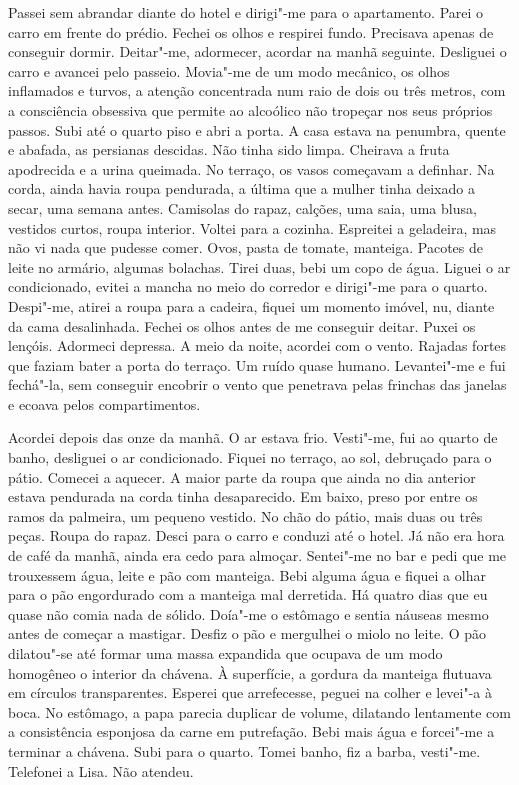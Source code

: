 Passei sem abrandar diante do hotel e dirigi"-me para o apartamento.
Parei o carro em frente do prédio. Fechei os olhos e respirei fundo.
Precisava apenas de conseguir dormir. Deitar"-me, adormecer, acordar na
manhã seguinte. Desliguei o carro e avancei pelo passeio. Movia"-me de
um modo mecânico, os olhos inflamados e turvos, a atenção concentrada
num raio de dois ou três metros, com a consciência obsessiva que permite
ao alcoólico não tropeçar nos seus próprios passos. Subi até o quarto
piso e abri a porta. A casa estava na penumbra, quente e abafada, as persianas
descidas. Não tinha sido limpa. Cheirava a fruta apodrecida e a
urina queimada. No terraço, os vasos começavam a definhar. Na corda,
ainda havia roupa pendurada, a última que a mulher tinha deixado a
secar, uma semana antes. Camisolas do rapaz, calções, uma saia, uma
blusa, vestidos curtos, roupa interior. Voltei para a cozinha. Espreitei
a geladeira, mas não vi nada que pudesse comer. Ovos, pasta de tomate,
manteiga. Pacotes de leite no armário, algumas bolachas. Tirei duas,
bebi um copo de água. Liguei o ar condicionado, evitei a mancha no meio
do corredor e dirigi"-me para o quarto. Despi"-me, atirei a roupa para a
cadeira, fiquei um momento imóvel, nu, diante da cama desalinhada.
Fechei os olhos antes de me conseguir deitar. Puxei os lençóis. Adormeci
depressa. A meio da noite, acordei com o vento. Rajadas fortes que
faziam bater a porta do terraço. Um ruído quase humano. Levantei"-me e
fui fechá"-la, sem conseguir encobrir o vento que penetrava pelas
frinchas das janelas e ecoava pelos compartimentos.

Acordei depois das onze da manhã. O ar estava frio. Vesti"-me, fui ao
quarto de banho, desliguei o ar condicionado. Fiquei no terraço, ao sol,
debruçado para o pátio. Comecei a aquecer. A maior parte da roupa que
ainda no dia anterior estava pendurada na corda tinha desaparecido. Em
baixo, preso por entre os ramos da palmeira, um pequeno vestido. No chão
do pátio, mais duas ou três peças. Roupa do rapaz. Desci para o carro e
conduzi até o hotel. Já não era hora de café da manhã, ainda era cedo
para almoçar. Sentei"-me no bar e pedi que me trouxessem água, leite e
pão com manteiga. Bebi alguma água e fiquei a olhar para o pão
engordurado com a manteiga mal derretida. Há quatro dias que eu quase
não comia nada de sólido. Doía"-me o estômago e sentia náuseas mesmo
antes de começar a mastigar. Desfiz o pão e mergulhei o miolo no leite.
O pão dilatou"-se até formar uma massa expandida que ocupava de um modo
homogêneo o interior da chávena. À superfície, a gordura da manteiga
flutuava em círculos transparentes. Esperei que arrefecesse, peguei na
colher e levei"-a à boca. No estômago, a papa parecia duplicar de
volume, dilatando lentamente com a consistência esponjosa da carne em
putrefação. Bebi mais água e forcei"-me a terminar a chávena. Subi para
o quarto. Tomei banho, fiz a barba, vesti"-me. Telefonei a Lisa. Não
atendeu.

